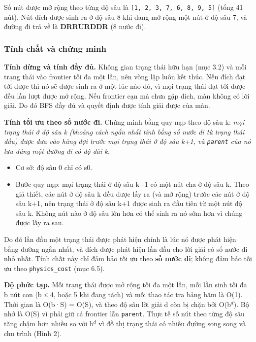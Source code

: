Số nút được mở rộng theo từng độ sâu là \texttt{[1, 2, 3, 7, 6, 8, 9, 5]} (tổng 41 nút). Nút đích được sinh ra ở độ sâu 8 khi đang mở rộng một nút ở độ sâu 7, và đường đi trả về là \textbf{DRRURDDR} (8 nước đi).

\subsubsection{Tính chất và chứng minh}

\textbf{Tính dừng và tính đầy đủ.} Không gian trạng thái hữu hạn (mục 3.2) và mỗi trạng thái vào frontier tối đa một lần, nên vòng lặp luôn kết thúc. Nếu đích đạt tới được thì nó sẽ được sinh ra ở một lúc nào đó, vì mọi trạng thái đạt tới được đều lần lượt được mở rộng. Nếu frontier cạn mà chưa gặp đích, màn không có lời giải. Do đó BFS đầy đủ và quyết định được tính giải được của màn.

\textbf{Tính tối ưu theo số nước đi.} Chứng minh bằng quy nạp theo độ sâu k: \emph{mọi trạng thái ở độ sâu k (khoảng cách ngắn nhất tính bằng số nước đi từ trạng thái đầu) được đưa vào hàng đợi trước mọi trạng thái ở độ sâu k+1, và \texttt{parent} của nó lưu đúng một đường đi có độ dài k.}

\begin{itemize}
\item Cơ sở: độ sâu 0 chỉ có s0.
\item Bước quy nạp: mọi trạng thái ở độ sâu k+1 có một nút cha ở độ sâu k. Theo giả thiết, các nút ở độ sâu k đều được lấy ra (và mở rộng) trước các nút ở độ sâu k+1, nên trạng thái ở độ sâu k+1 được sinh ra đầu tiên từ một nút độ sâu k. Không nút nào ở độ sâu lớn hơn có thể sinh ra nó sớm hơn vì chúng được lấy ra sau.
\end{itemize}

Do đó lần đầu một trạng thái được phát hiện chính là lúc nó được phát hiện bằng đường ngắn nhất, và đích được phát hiện lần đầu cho lời giải có số nước đi nhỏ nhất. Tính chất này chỉ đảm bảo tối ưu theo \textbf{số nước đi}; không đảm bảo tối ưu theo \texttt{physics\_\allowbreak{}cost} (mục 6.5).

\textbf{Độ phức tạp.} Mỗi trạng thái được mở rộng tối đa một lần, mỗi lần sinh tối đa b nút con (b ≤ 4, hoặc 5 khi đang tách) và mỗi thao tác tra bảng băm là O(1). Thời gian là O(b·\textbar{}S\textbar{}) = O(\textbar{}S\textbar{}), và theo độ sâu lời giải d còn bị chặn bởi O(b$^{d}$). Bộ nhớ là O(\textbar{}S\textbar{}) vì phải giữ cả frontier lẫn \texttt{parent}. Thực tế số nút theo từng độ sâu tăng chậm hơn nhiều so với b$^{d}$ vì đồ thị trạng thái có nhiều đường song song và chu trình (Hình 2).

